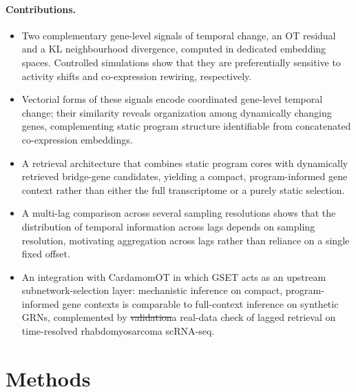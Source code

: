 \documentclass[10pt, letterpaper]{article}
\DeclareRobustCommand{\eliasadds}[1]{{\color{red}#1}}
\DeclareRobustCommand{\eliasremoves}[1]{{\color{red}\sout{#1}}}
\begin{document}
\paragraph{Contributions.}
\begin{itemize}[leftmargin=1.2em]
\item Two complementary gene-level signals of temporal change, an OT residual and a KL neighbourhood divergence, computed in dedicated embedding spaces. Controlled simulations show that they are preferentially sensitive to activity shifts and co-expression rewiring, respectively.

\item Vectorial forms of these signals encode coordinated gene-level temporal change; their similarity reveals organization among dynamically changing genes, complementing static program structure identifiable from concatenated co-expression embeddings.

\item A retrieval architecture that combines static program cores with dynamically retrieved bridge-gene candidates, yielding a compact, program-informed gene context rather than either the full transcriptome or a purely static selection.

\item A multi-lag comparison across several sampling resolutions shows that the distribution of temporal information across lags depends on sampling resolution, motivating aggregation across lags rather than reliance on a single fixed offset.

\item An integration with CardamomOT in which GSET acts as an upstream subnetwork-selection layer: mechanistic inference on compact, program-informed gene contexts is comparable to full-context inference on synthetic GRNs, complemented by \eliasremoves{validation}\eliasadds{a real-data check of lagged retrieval} on time-resolved rhabdomyosarcoma scRNA-seq.
\end{itemize}







\section{Methods}
\label{sec:methods}
\end{document}
